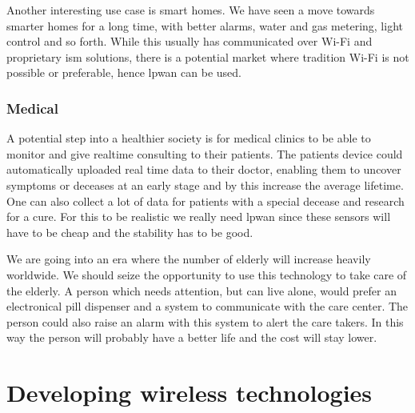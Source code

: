 \documentclass[USenglish]{ifimaster}  %
\begin{document}
Another interesting use case is smart homes. We have seen a move towards smarter homes for a long time, with better alarms, water and gas metering, light control and so forth. While this usually has communicated over Wi-Fi and proprietary \acrfull{ism} solutions, there is a potential market where tradition Wi-Fi is not possible or preferable, hence \acrshort{lpwan} can be used.

\subsubsection{Medical}
A potential step into a healthier society is for medical clinics to be able to monitor and give realtime consulting to their patients. The patients device could automatically uploaded real time data to their doctor, enabling them to uncover symptoms or deceases at an early stage and by this increase the average lifetime. One can also collect a lot of data for patients with a special decease and research for a cure. For this to be realistic we really need \acrshort{lpwan} since these sensors will have to be cheap and the stability has to be good.

We are going into an era where the number of elderly will increase heavily worldwide. We should seize the opportunity to use this technology to take care of the elderly. A person which needs attention, but can live alone, would prefer an electronical pill dispenser and a system to communicate with the care center. The person could also raise an alarm with this system to alert the care takers. In this way the person will probably have a better life and the cost will stay lower.

\section{Developing wireless technologies} \label{section:wirelesstech}
\end{document}
